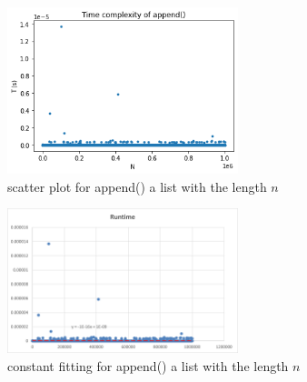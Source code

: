 \documentclass[12pt]{article}
\begin{document}
\begin{figure}[h!]
\centering
\includegraphics[width=0.6\textwidth,height=\textheight,keepaspectratio]{figure_5.png}
\caption{scatter plot for append() a list with the length $n$}
\label{Figure: 5}
\end{figure}

\begin{figure}[h!]
\centering
\includegraphics[width=0.6\textwidth,height=\textheight,keepaspectratio]{picture/append1.png}
\caption{constant fitting for append() a list with the length $n$}
\label{append1}
\end{figure}
\end{document}
